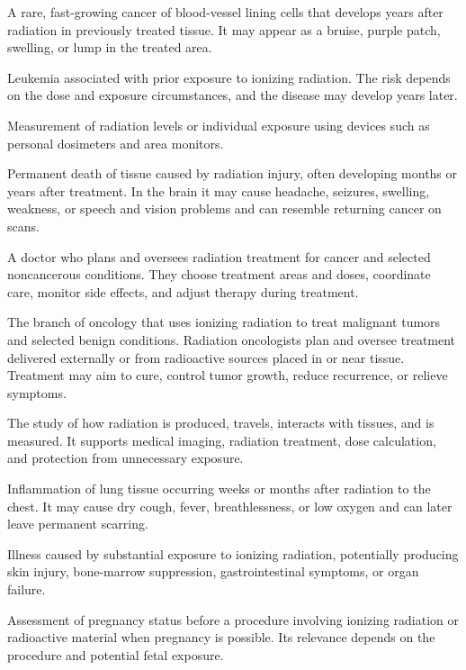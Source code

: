  A rare, fast-growing cancer of blood-vessel lining cells that develops years after radiation in previously treated tissue. It may appear as a bruise, purple patch, swelling, or lump in the treated area.

 Leukemia associated with prior exposure to ionizing radiation. The risk depends on the dose and exposure circumstances, and the disease may develop years later.

 Measurement of radiation levels or individual exposure using devices such as personal dosimeters and area monitors.

 Permanent death of tissue caused by radiation injury, often developing months or years after treatment. In the brain it may cause headache, seizures, swelling, weakness, or speech and vision problems and can resemble returning cancer on scans.

 A doctor who plans and oversees radiation treatment for cancer and selected noncancerous conditions. They choose treatment areas and doses, coordinate care, monitor side effects, and adjust therapy during treatment.

 The branch of oncology that uses ionizing radiation to treat malignant
tumors and selected benign conditions. Radiation oncologists plan and oversee treatment
delivered externally or from radioactive sources placed in or near tissue. Treatment may
aim to cure, control tumor growth, reduce recurrence, or relieve symptoms.

 The study of how radiation is produced, travels, interacts with tissues, and is measured. It supports medical imaging, radiation treatment, dose calculation, and protection from unnecessary exposure.

 Inflammation of lung tissue occurring weeks or months after radiation to the chest. It may cause dry cough, fever, breathlessness, or low oxygen and can later leave permanent scarring.

 Illness caused by substantial exposure to ionizing radiation, potentially producing skin injury,
bone-marrow suppression, gastrointestinal symptoms, or organ failure.

 Assessment of pregnancy status before a procedure involving ionizing radiation or radioactive material when pregnancy is possible. Its relevance depends on the procedure and potential fetal exposure.

